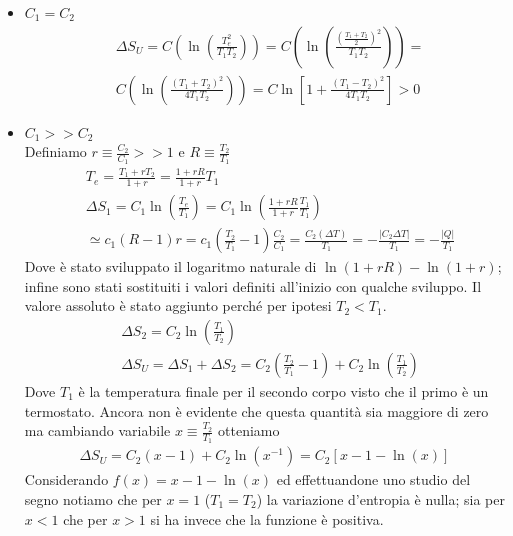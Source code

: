 \documentclass[
10pt, %
a4paper, %
oneside, %
headinclude,footinclude, %
BCOR5mm, %
]{scrartcl}
\begin{document}
\begin{itemize}
	\item \(C_1=C_2\)\\
	\begin{align*}
		&\Delta S_U = C\left(\ln\left(\frac{T_e^2}{T_1T_2}\right) \right) = C\left(\ln\left(\frac{(\frac{T_1 + T_2}{2})^2}{T_1T_2}\right) \right)=\\
		&C\left(\ln\left(\frac{(T_1 + T_2)^2}{4T_1T_2}\right) \right)=C \ln\left[1 + \frac{(T_1 - T_2)^2}{4T_1T_2}\right]>0
	\end{align*}
	\item \(C_1>>C_2\)\\
	Definiamo \(r \equiv \frac{C_2}{C_1}>>1\) e \(R \equiv \frac{T_2}{T_1}\)
	\begin{align*}
		&T_e = \frac{T_1 + r T_2}{1+r}= \frac{1+rR}{1+r}T_1\\
		&\Delta S_1 = C_1 \ln\left(\frac{T_e}{T_1}\right) = C_1 \ln\left(\frac{1+rR}{1+r}\frac{T_1}{T_1}\right)\\
		&\simeq c_1(R-1)r = c_1(\frac{T_2}{T_1}-1) \frac{C_2}{C_1} = \frac{C_2 (\Delta T)}{T_1} = -\frac{|C_2\Delta T|}{T_1}=-\frac{|Q|}{T_1}
	\end{align*}
	Dove è stato sviluppato il logaritmo naturale di \(\ln(1+rR)-\ln(1+r)\); infine sono stati sostituiti i valori definiti all'inizio con qualche sviluppo. Il valore assoluto è stato aggiunto perché per ipotesi \(T_2<T_1\).
	\begin{align*}
		&\Delta S_2 = C_2 \ln\left(\frac{T_1}{T_2}\right)\\
		&\Delta S_U = \Delta S_1 + \Delta S_2 = C_2 \left(\frac{T_2}{T_1}-1\right) +  C_2 \ln\left(\frac{T_1}{T_2}\right) 
	\end{align*}
	Dove \(T_1\) è la temperatura finale per il secondo corpo visto che il primo è un termostato. Ancora non è evidente che questa quantità sia maggiore di zero ma cambiando variabile \(x \equiv \frac{T_2}{T_1}\) otteniamo
	\begin{align*}
		\Delta S_U = C_2(x-1)+ C_2\ln(x^{-1}) = C_2\left[x-1-\ln(x)\right]
	\end{align*}
	Considerando \(f(x) = x-1-\ln(x)\) ed effettuandone uno studio del segno notiamo che per \(x=1\) (\(T_1= T_2\)) la variazione d'entropia è nulla; sia per \(x<1\) che per \(x>1\) si ha invece che la funzione è positiva. 
\end{itemize}
\end{document}
